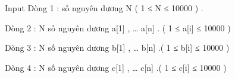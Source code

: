 Input
Dòng 1 : số nguyên dương N ( 1 ≤ N ≤ 10000 ) .   


   Dòng 2 : N số nguyên dương a[1] , … a[n] . ( 1 ≤ a[i] ≤ 10000 )   


   Dòng 3 : N số nguyên dương b[1] , … b[n] .( 1 ≤ b[i] ≤ 10000 )   


   Dòng 4 : N số nguyên dương c[1] , … c[n] .( 1 ≤ c[i] ≤ 10000 )
